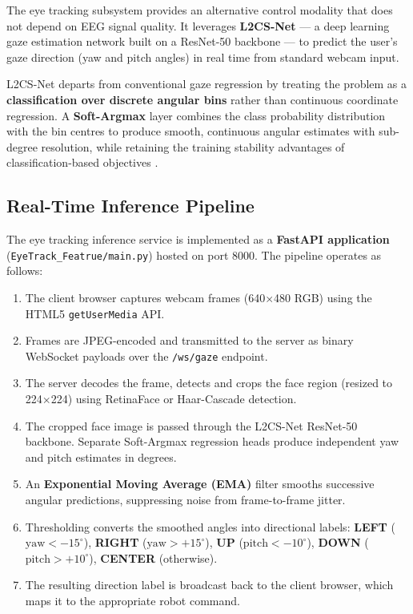\documentclass[12pt, a4paper, oneside]{report}
\begin{document}
\begin{description}
The eye tracking subsystem provides an alternative control modality that does not
depend on EEG signal quality. It leverages \textbf{L2CS-Net} --- a deep learning
gaze estimation network built on a ResNet-50 backbone --- to predict the user's
gaze direction (yaw and pitch angles) in real time from standard webcam input.

L2CS-Net departs from conventional gaze regression by treating the problem as a
\textbf{classification over discrete angular bins} rather than continuous coordinate
regression. A \textbf{Soft-Argmax} layer combines the class probability distribution
with the bin centres to produce smooth, continuous angular estimates with sub-degree
resolution, while retaining the training stability advantages of classification-based
objectives \cite{kellnhofer2019}.

\subsection{Real-Time Inference Pipeline}

The eye tracking inference service is implemented as a \textbf{FastAPI application}
(\texttt{EyeTrack\_Featrue/main.py}) hosted on port 8000. The pipeline operates
as follows:

\begin{enumerate}
  \item The client browser captures webcam frames (640$\times$480 RGB) using the
        HTML5 \texttt{getUserMedia} API.
  \item Frames are JPEG-encoded and transmitted to the server as binary WebSocket
        payloads over the \texttt{/ws/gaze} endpoint.
  \item The server decodes the frame, detects and crops the face region (resized
        to 224$\times$224) using RetinaFace or Haar-Cascade detection.
  \item The cropped face image is passed through the L2CS-Net ResNet-50 backbone.
        Separate Soft-Argmax regression heads produce independent yaw and pitch
        estimates in degrees.
  \item An \textbf{Exponential Moving Average (EMA)} filter smooths successive
        angular predictions, suppressing noise from frame-to-frame jitter.
  \item Thresholding converts the smoothed angles into directional labels:
        \textbf{LEFT} ($\text{yaw} < -15^\circ$),
        \textbf{RIGHT} ($\text{yaw} > +15^\circ$),
        \textbf{UP} ($\text{pitch} < -10^\circ$),
        \textbf{DOWN} ($\text{pitch} > +10^\circ$),
        \textbf{CENTER} (otherwise).
  \item The resulting direction label is broadcast back to the client browser, which
        maps it to the appropriate robot command.
\end{enumerate}


\end{description}
\end{document}
